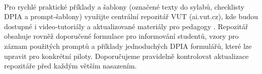 \paragraph{}
Pro rychlé praktické příklady a šablony (označené texty do sylabů, checklisty DPIA a prompt‑šablony) využijte centrální repozitář VUT (ai.vut.cz), kde budou dostupné i video‑tutoriály a aktualizované materiály pro pedagogy \cite{kb_ai_101_tipu_pdf_04e4a115_page_15_2}. Repozitář obsahuje rovněž doporučené formulace pro informování studentů, vzory pro záznam použitých promptů a příklady jednoduchých DPIA formulářů, které lze upravit pro konkrétní piloty. Doporučujeme pravidelně kontrolovat aktualizace repozitáře před každým větším nasazením.